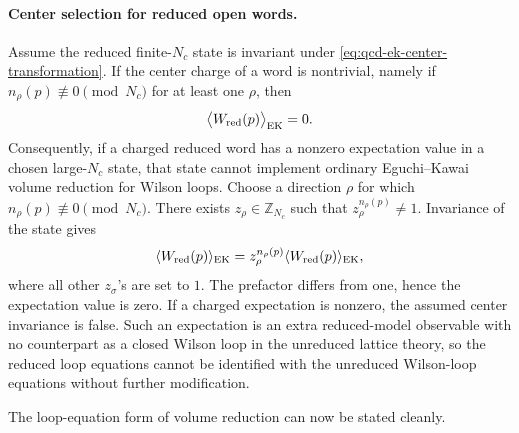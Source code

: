 \paragraph{Center selection for reduced open words.}
Assume the reduced finite-\(N_c\) state is invariant under
\eqref{eq:qcd-ek-center-transformation}.  If the center charge of a word is
nontrivial, namely if \(n_\rho(p)\not\equiv0\pmod{N_c}\) for at least one
\(\rho\), then
\[
  \bigl\langle W_{\rm red}(p)\bigr\rangle_{\rm EK}=0 .
\]
Consequently, if a charged reduced word has a nonzero expectation value in a
chosen large-\(N_c\) state, that state cannot implement ordinary
Eguchi--Kawai volume reduction for Wilson loops.
Choose a direction \(\rho\) for which
\(n_\rho(p)\not\equiv0\pmod{N_c}\).  There exists
\(z_\rho\in\mathbb Z_{N_c}\) such that \(z_\rho^{n_\rho(p)}\ne1\).  Invariance
of the state gives
\[
  \langle W_{\rm red}(p)\rangle_{\rm EK}
  =
  z_\rho^{n_\rho(p)}
  \langle W_{\rm red}(p)\rangle_{\rm EK},
\]
where all other \(z_\sigma\)'s are set to \(1\).  The prefactor differs from
one, hence the expectation value is zero.  If a charged expectation is
nonzero, the assumed center invariance is false.  Such an expectation is an
extra reduced-model observable with no counterpart as a closed Wilson loop in the
unreduced lattice theory, so the reduced loop equations cannot be identified
with the unreduced Wilson-loop equations without further modification.

The loop-equation form of volume reduction can now be stated cleanly.

